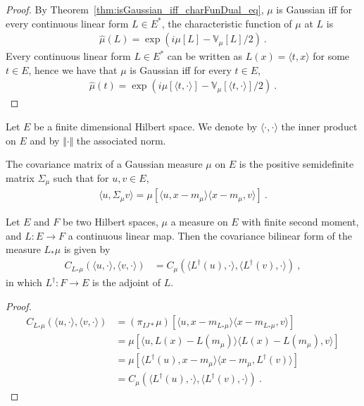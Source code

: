 \begin{proof}
By Theorem~\ref{thm:isGaussian_iff_charFunDual_eq}, $\mu$ is Gaussian iff for every continuous linear form $L \in E^*$, the characteristic function of $\mu$ at $L$ is
\begin{align*}
  \hat{\mu}(L) = \exp\left(i \mu[L] - \mathbb{V}_\mu[L] / 2\right) \: .
\end{align*}
Every continuous linear form $L \in E^*$ can be written as $L(x) = \langle t, x \rangle$ for some $t \in E$, hence we have that $\mu$ is Gaussian iff for every $t \in E$,
\begin{align*}
  \hat{\mu}(t) = \exp\left(i \mu[\langle t, \cdot \rangle] - \mathbb{V}_\mu[\langle t, \cdot \rangle] / 2\right) \: .
\end{align*}
\end{proof}

Let $E$ be a finite dimensional Hilbert space. We denote by $\langle \cdot, \cdot \rangle$ the inner product on $E$ and by $\Vert \cdot \Vert$ the associated norm.


\begin{definition}\label{def:covMatrix}
The covariance matrix of a Gaussian measure $\mu$ on $E$ is the positive semidefinite matrix $\Sigma_\mu$ such that for $u, v \in E$,
\begin{align*}
  \langle u, \Sigma_\mu v\rangle = \mu[\langle u, x - m_\mu \rangle \langle x - m_\mu, v \rangle] \: .
\end{align*}
\end{definition}


\begin{lemma}\label{lem:covarianceBilin_map}
Let $E$ and $F$ be two Hilbert spaces, $\mu$ a measure on $E$ with finite second moment, and $L : E \to F$ a continuous linear map.
Then the covariance bilinear form of the measure $L_*\mu$ is given by
\begin{align*}
  C_{L_*\mu}(\langle u, \cdot\rangle, \langle v, \cdot\rangle)
  &= C_\mu(\langle L^\dagger(u), \cdot\rangle, \langle L^\dagger(v), \cdot\rangle)
  \: ,
\end{align*}
in which $L^\dagger : F \to E$ is the adjoint of $L$.
\end{lemma}

\begin{proof}
\begin{align*}
  C_{L_*\mu}(\langle u, \cdot\rangle, \langle v, \cdot\rangle)
  &= (\pi_{IJ*}\mu)\left[\langle u, x - m_{L_*\mu}\rangle \langle x - m_{L_*\mu}, v \rangle\right]
  \\
  &= \mu\left[\langle u, L(x) - L(m_\mu)\rangle \langle L(x) - L(m_\mu), v \rangle \right]
  \\
  &= \mu\left[\langle L^\dagger(u), x - m_\mu\rangle \langle x - m_\mu, L^\dagger(v) \rangle \right]
  \\
  &= C_\mu(\langle L^\dagger(u), \cdot\rangle, \langle L^\dagger(v), \cdot\rangle)
  \: .
\end{align*}
\end{proof}


